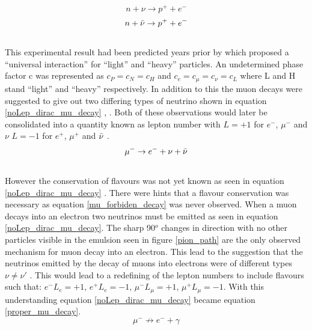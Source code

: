 \begin{equation}
    n + \nu \rightarrow p^+ + e^-
    \label{no_lepNo_dirac_nu_capture}
\end{equation}
\begin{equation}
    n + \Bar{\nu} \rightarrow p^+ + e^-
    \label{no_lepNo_maj_nu_capture}
\end{equation}
\\This experimental result had been predicted years prior by \cite{konopinski1953universal} which proposed a ``universal interaction'' for ``light'' and ``heavy'' particles. An undetermined phase factor c was represented as $c_P=c_N=c_H$ and $c_e=c_\mu=c_\nu=c_L$ where L and H stand ``light'' and ``heavy'' respectively. In addition to this the muon decays were suggested to give out two differing types of neutrino shown in equation \ref{noLep_dirac_mu_decay} \cite{griffiths2008book} \cite{griffiths2008neutrino1.5}, \cite{konopinski1953universal}. Both of these observations would later be consolidated into a quantity known as lepton number with $L=+1$ for $e^-$, $\mu^-$ and $\nu$ $L=-1$ for $e^+$, $\mu^+$ and $\Bar{\nu}$ \cite{griffiths2008book}\cite{griffiths2008neutrino1.5}. 
\begin{equation}
    \mu^- \rightarrow e^- + \nu + \Bar{\nu}
    \label{noLep_dirac_mu_decay}
\end{equation}
\\However the conservation of flavours was not yet known as seen in equation \ref{noLep_dirac_mu_decay} \cite{griffiths2008book} \cite{griffiths2008neutrino1.5}. There were hints that a flavour conservation was necessary as equation \ref{mu_forbiden_decay} was never observed. When a muon decays into an electron two neutrinos must be emitted as seen in equation \ref{noLep_dirac_mu_decay}. The sharp 90$^o$ changes in direction with no other particles visible in the emulsion seen in figure \ref{pion_path} are the only observed mechanism for muon decay into an electron. This lead to the suggestion that the neutrinos emitted by the decay of muons into electrons were of different types $\nu \not= \nu'$ \cite{Lee:1960tja} \cite{griffiths2008book} \cite{griffiths2008neutrino1.5}. This would lead to a redefining of the lepton numbers to include flavours such that: $e^- L_e = +1$, $e^+ L_e = -1$, $\mu^- L_\mu = +1 $, $\mu^+ L_\mu = -1 $. With this understanding equation \ref{noLep_dirac_mu_decay} became equation \ref{proper_mu_decay}.
\begin{equation}
    \mu^- \not\to e^- + \gamma
    \label{mu_forbiden_decay}
\end{equation}
